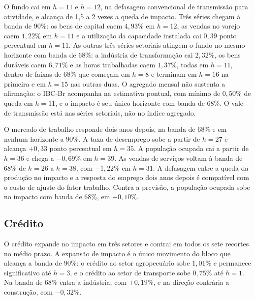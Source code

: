 \documentclass[preprint,authoryear,review,12pt]{elsarticle}
\begin{document}
O fundo cai em $h = 11$ e $h = 12$, na defasagem convencional de transmissão para atividade, e alcança de 1,5 a 2 vezes a queda de impacto. Três séries chegam à banda de 90\%: os bens de capital caem $4{,}93\%$ em $h = 12$, as vendas no varejo caem $1{,}22\%$ em $h = 11$ e a utilização da capacidade instalada cai $0{,}39$ ponto percentual em $h = 11$. As outras três séries setoriais atingem o fundo no mesmo horizonte com banda de 68\%: a indústria de transformação cai $2{,}32\%$, os bens duráveis caem $6{,}71\%$ e as horas trabalhadas caem $1{,}37\%$, todas em $h = 11$, dentro de faixas de 68\% que começam em $h = 8$ e terminam em $h = 16$ na primeira e em $h = 15$ nas outras duas. O agregado mensal não sustenta a afirmação: o IBC-Br acompanha na estimativa pontual, com mínimo de $0{,}50\%$ de queda em $h = 11$, e o impacto é seu único horizonte com banda de 68\%. O vale de transmissão está nas séries setoriais, não no índice agregado.

O mercado de trabalho responde dois anos depois, na banda de 68\% e em nenhum horizonte a 90\%. A taxa de desemprego sobe a partir de $h = 27$ e alcança $+0{,}33$ ponto percentual em $h = 35$. A população ocupada cai a partir de $h = 36$ e chega a $-0{,}69\%$ em $h = 39$. As vendas de serviços voltam à banda de 68\% de $h = 26$ a $h = 38$, com $-1{,}22\%$ em $h = 31$. A defasagem entre a queda da produção no impacto e a resposta do emprego dois anos depois é compatível com o custo de ajuste do fator trabalho. Contra a previsão, a população ocupada sobe no impacto com banda de 68\%, em $+0{,}10\%$.

\subsection{Crédito}

O crédito expande no impacto em três setores e contrai em todos os sete recortes no médio prazo. A expansão de impacto é o único movimento do bloco que alcança a banda de 90\%: o crédito ao setor agropecuário sobe $1{,}01\%$ e permanece significativo até $h = 3$, e o crédito ao setor de transporte sobe $0{,}75\%$ até $h = 1$. Na banda de 68\% entra a indústria, com $+0{,}19\%$, e na direção contrária a construção, com $-0{,}32\%$.



\end{document}
